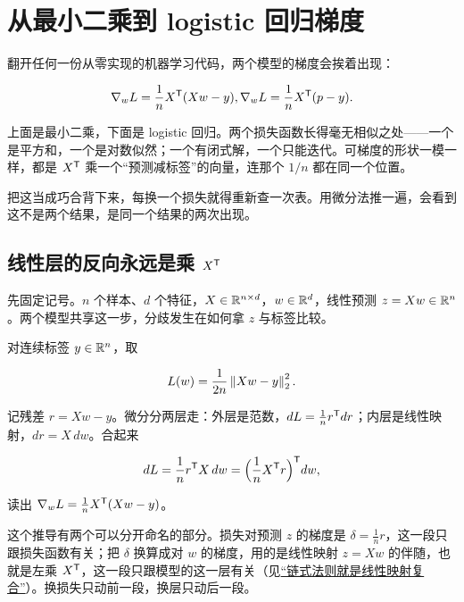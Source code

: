 \section{从最小二乘到 logistic 回归梯度}
\label{sec:10-Matrix-Calculus/04-Applications/01}

翻开任何一份从零实现的机器学习代码，两个模型的梯度会挨着出现：

\[
\nabla_wL=\frac1nX^{\mathsf{T}}(Xw-y),
\space
\nabla_wL=\frac1nX^{\mathsf{T}}(p-y).
\]

上面是最小二乘，下面是 logistic 回归。两个损失函数长得毫无相似之处——一个是平方和，一个是对数似然；一个有闭式解，一个只能迭代。可梯度的形状一模一样，都是 \(X^{\mathsf{T}}\) 乘一个``预测减标签''的向量，连那个 \(1/n\) 都在同一个位置。

把这当成巧合背下来，每换一个损失就得重新查一次表。用微分法推一遍，会看到这不是两个结果，是同一个结果的两次出现。

\subsection{线性层的反向永远是乘 \texorpdfstring{\(X^{\mathsf{T}}\)}{X 转置}}

先固定记号。\(n\) 个样本、\(d\) 个特征，\(X\in\mathbb{R}^{n\times d}\)，\(w\in\mathbb{R}^d\)，线性预测 \(z=Xw\in\mathbb{R}^n\)。两个模型共享这一步，分歧发生在如何拿 \(z\) 与标签比较。

对连续标签 \(y\in\mathbb{R}^n\)，取

\[
L(w)=\frac1{2n}\left\lVert Xw-y\right\rVert_2^2.
\]

记残差 \(r=Xw-y\)。微分分两层走：外层是范数，\(dL=\frac1nr^{\mathsf{T}}dr\)；内层是线性映射，\(dr=X\,dw\)。合起来

\[
dL=\frac1nr^{\mathsf{T}}X\,dw=\Bigl(\frac1nX^{\mathsf{T}}r\Bigr)^{\mathsf{T}}dw,
\]

读出 \(\nabla_wL=\frac1nX^{\mathsf{T}}(Xw-y)\)。

这个推导有两个可以分开命名的部分。损失对预测 \(z\) 的梯度是 \(\delta=\frac1nr\)，这一段只跟损失函数有关；把 \(\delta\) 换算成对 \(w\) 的梯度，用的是线性映射 \(z=Xw\) 的伴随，也就是左乘 \(X^{\mathsf{T}}\)，这一段只跟模型的这一层有关（见\hyperref[sec:10-Matrix-Calculus/02-Differentials/02]{``链式法则就是线性映射复合''}）。换损失只动前一段，换层只动后一段。

